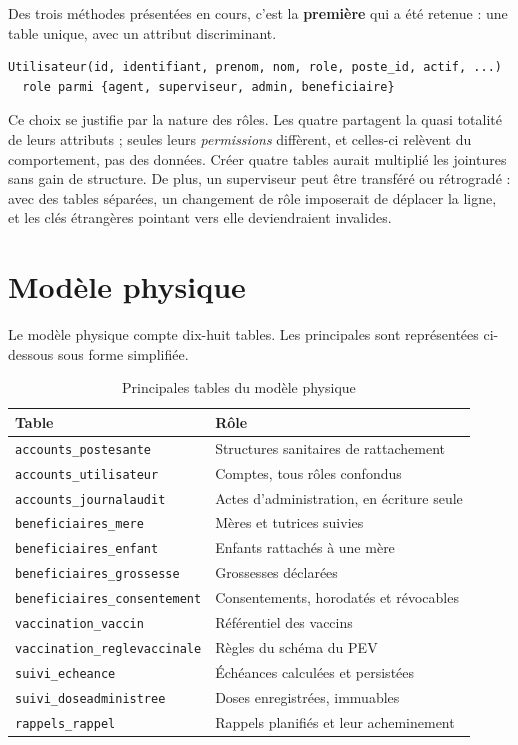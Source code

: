 \documentclass[11pt,a4paper]{report}
\begin{document}
Des trois méthodes présentées en cours, c'est la \textbf{première} qui a été
retenue : une table unique, avec un attribut discriminant.

\begin{lstlisting}
Utilisateur(id, identifiant, prenom, nom, role, poste_id, actif, ...)
  role parmi {agent, superviseur, admin, beneficiaire}
\end{lstlisting}

Ce choix se justifie par la nature des rôles. Les quatre partagent la quasi
totalité de leurs attributs ; seules leurs \emph{permissions} diffèrent, et
celles-ci relèvent du comportement, pas des données. Créer quatre tables
aurait multiplié les jointures sans gain de structure. De plus, un
superviseur peut être transféré ou rétrogradé : avec des tables séparées, un
changement de rôle imposerait de déplacer la ligne, et les clés étrangères
pointant vers elle deviendraient invalides.

\section{Modèle physique}

Le modèle physique compte dix-huit tables. Les principales sont représentées
ci-dessous sous forme simplifiée.

\begin{table}[H]
\centering
\small
\begin{tabularx}{\textwidth}{@{}lX@{}}
\toprule
\textbf{Table} & \textbf{Rôle} \\
\midrule
\texttt{accounts\_postesante} & Structures sanitaires de rattachement \\
\texttt{accounts\_utilisateur} & Comptes, tous rôles confondus \\
\texttt{accounts\_journalaudit} & Actes d'administration, en écriture seule \\
\texttt{beneficiaires\_mere} & Mères et tutrices suivies \\
\texttt{beneficiaires\_enfant} & Enfants rattachés à une mère \\
\texttt{beneficiaires\_grossesse} & Grossesses déclarées \\
\texttt{beneficiaires\_consentement} & Consentements, horodatés et révocables \\
\texttt{vaccination\_vaccin} & Référentiel des vaccins \\
\texttt{vaccination\_reglevaccinale} & Règles du schéma du PEV \\
\texttt{suivi\_echeance} & Échéances calculées et persistées \\
\texttt{suivi\_doseadministree} & Doses enregistrées, immuables \\
\texttt{rappels\_rappel} & Rappels planifiés et leur acheminement \\
\bottomrule
\end{tabularx}
\caption{Principales tables du modèle physique}
\end{table}
\end{document}
